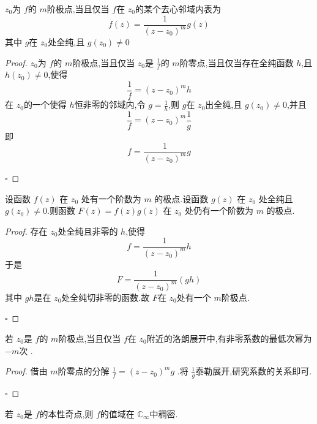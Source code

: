 \documentclass[../../复变函数.tex]{subfiles}
\begin{document}
  \begin{theorem}
    \(  z_0  \)为 \(  f  \)的 \(  m  \)阶极点,当且仅当 \(  f  \)在 \(  z_0  \)的某个去心邻域内表为 \[
    f\left( z \right)= \frac{1 }{\left( z-z_0 \right)^{m} } g\left( z \right)   
    \]其中 \(  g  \)在 \(  z_0  \)处全纯,且 \(  g\left( z_0 \right)\neq 0   \)        
\end{theorem}
\begin{proof}
    \(  z_0  \)为 \(  f  \)的 \(  m  \)阶极点,当且仅当 \(  z_0  \)是 \(  \frac{1 }{f }   \)的 \(  m  \)阶零点,当且仅当存在全纯函数 \(  h  \),且 \(  h\left( z_0 \right)\neq 0   \),使得 \[
    \frac{1 }{f }= \left( z-z_0 \right)^{m}h  
    \]   在 \(  z_0  \)的一个使得 \(  h  \)恒非零的邻域内,令 \(  g = \frac{1 }{h }   \),则 \(  g  \)在 \(  z_0  \)出全纯,且 \(  g\left( z_0 \right)\neq 0   \),并且 \[
    \frac{1 }{f }= \left( z-z_0 \right)^{m}\frac{1 }{g }   
    \]即 \[
    f= \frac{1 }{\left( z-z_0 \right)^{m}  }g 
    \]       

    \hfill $\square$
\end{proof}

\begin{corollary}
     设函数 $f(z)$ 在 $z_0$ 处有一个阶数为 $m$ 的极点.设函数 $g(z)$ 在 $z_0$ 处全纯且 $g(z_0) \ne 0$.则函数 $F(z) = f(z)g(z)$ 在 $z_0$ 处仍有一个阶数为 $m$ 的极点.
\end{corollary}
\begin{proof}
    存在 \(  z_0  \)处全纯且非零的  \(  h  \),使得 \[
    f= \frac{1 }{\left( z-z_0 \right)^{m}  }h 
    \]  于是 \[
    F=  \frac{1 }{\left( z-z_0 \right)^{m}  } \left( gh \right)  
    \]其中 \(  gh  \)是在 \(  z_0  \)处全纯切非零的函数.故 \(  F  \)在 \(  z_0  \)处有一个 \(  m  \)阶极点.     

    \hfill $\square$
\end{proof}
\begin{theorem}
    若 \(  z_0  \)是 \(  f  \)的 \(  m  \)阶极点,当且仅当 \(  f  \)在 \(  z_0  \)附近的洛朗展开中,有非零系数的最低次幂为 \(  -m  \)次 . 
\end{theorem}

\begin{proof}
    借由 \(  m  \)阶零点的分解 \(  \frac{1 }{f }= \left( z-z_0 \right)^{m}g  \) .将 \(  \frac{1 }{g }   \)泰勒展开,研究系数的关系即可. 

    \hfill $\square$
\end{proof}


\begin{theorem}
    若 \(  z_0  \)是 \(  f  \)的本性奇点,则 \(  f  \)的值域在 \(  \mathbb{C} _{\infty}  \)中稠密.    
\end{theorem}
\end{document}
